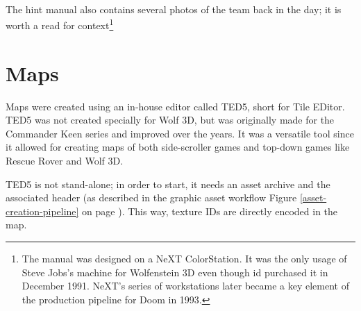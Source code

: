 \documentclass[book.tex]{subfiles}
\begin{document}
 





\label{hitler_drawing}
\begin{figure}[H]
\centering    
   \end{figure}



     \begin{figure}[H]
\centering
   \end{figure}
 
  \begin{figure}[H]
\centering
 \\
 \end{figure}



     \begin{figure}[H]
\centering
   \end{figure}

     \begin{figure}[H]
\centering
   \end{figure}


\par 
The hint manual also contains several photos of the team back in the day; it is worth a read for context\footnote{The manual was designed on a NeXT ColorStation. It was the only usage of Steve Jobs's machine for Wolfenstein 3D even though id purchased it in December 1991. NeXT's series of workstations later became a key element of the production pipeline for Doom in 1993.}













\section{Maps}
Maps were created using an in-house editor called TED5, short for Tile EDitor. TED5 was not created specially for Wolf 3D, but was originally made for the Commander Keen series and improved over the years. It was a versatile tool since it allowed for creating maps of both side-scroller games and top-down games like Rescue Rover and Wolf 3D.\\
\par
 TED5 is not stand-alone; in order to start, it needs an asset archive and the  associated header (as described in the graphic asset workflow Figure \ref{asset-creation-pipeline} on page \pageref{asset-creation-pipeline}). This way, texture IDs are directly encoded in the map.\\
\end{document}
